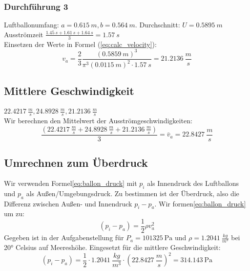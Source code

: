 \documentclass{article}
\begin{document}
    \subsubsection{Durchführung 3}
        Luftballonumfang: \(a = \SI{0.615}{m}, b = \SI{0.564}{m} \). Durchschnitt: \(U = \SI{0.5895}{m} \) \\
        Ausströmzeit \( \frac{\SI{1.45}{s} + \SI{1.61}{s} + \SI{1.64}{s} }{3} = \SI{1.57}{s} \) \\
        Einsetzen der Werte in Formel (\ref{eq:calc_velocity}):
        \[ v_a = \frac{2}{3} \frac{{( \SI{0.5859}{m} )}^3}{\pi^3 {( \SI{0.0115}{m} )}^2 \cdot \SI{1.57}{s} } = \SI{21.2136}{\frac{m}{s}} \]

    \subsection{Mittlere Geschwindigkeit}
    \( \SI{22.4217}{\frac{m}{s}}, \SI{24.8928}{\frac{m}{s}}, \SI{21.2136}{\frac{m}{s}} \) \\
    Wir berechnen den Mittelwert der Ausströmgeschwindigkeiten:
    \begin{equation} \label{val:mittlere_geschw}
        \frac{ ( \SI{22.4217}{\frac{m}{s}}  + \SI{24.8928}{\frac{m}{s}} + \SI{21.2136}{\frac{m}{s}} ) }{3} = \bar{v}_a = \SI{22.8427}{\frac{m}{s}}
    \end{equation}

    \subsection{Umrechnen zum Überdruck}
    Wir verwenden Formel\ref{eq:ballon_druck} mit \(p_i\) als Innendruck des Luftballons und \(p_a\) als Außen/Umgebungsdruck.
    Zu bestimmen ist der Überdruck, also die Differenz zwischen Außen- und Innendruck \(p_i - p_a\).
    Wir formen\ref{eq:ballon_druck} um zu:
    \begin{equation} \label{eq:ballon_uberdruck}
        (p_i - p_a) = \frac{1}{2} \rho v_a^2
    \end{equation}
    Gegeben ist in der Aufgabenstellung\cite{Aufgabenstellung} für \( P_a = \SI{101 325}{\pascal} \) und \(\rho = \SI{1.2041}{\frac{kg}{m^3}} \) bei 20° Celsius auf Meereshöhe. 
    Eingesetzt für die mittlere Geschwindigkeit:
    \begin{equation}
        (p_i - p_a) = \frac{1}{2} \cdot \SI{1.2041}{\frac{kg}{m^3}} \cdot { ( \SI{22.8427}{\frac{m}{s}} )}^2 = \SI{314.143}{\pascal}
    \end{equation}
    
\end{document}
